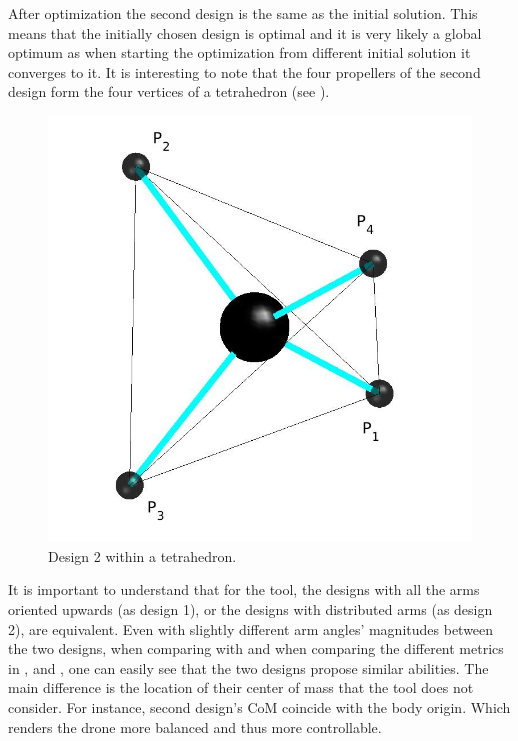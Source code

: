 After optimization the second design is the same as the initial solution. This means
that the initially chosen design is optimal and it is very likely a global optimum
as when starting the optimization from different initial solution it converges to it.
It is interesting to note that the four propellers of the second design form the four
vertices of a tetrahedron (see ).\\

\begin{figure}[!ht]
  \centering
  \includegraphics[width=0.35\linewidth]{images/Quad_tetrahedron.jpg}
  \caption{Design 2 within a tetrahedron.}
  \label{fig:Quadcopter_2_tetra}
\end{figure}

It is important to understand that for the tool, the designs with all the arms
oriented upwards (as design 1), or the designs with distributed arms (as design 2),
are equivalent. Even with slightly different arm angles’ magnitudes
between the two designs, when comparing with
 and when comparing the different metrics
in ,  and
, one can easily see that the two designs
propose similar abilities. The main difference is the location of their center of mass
that the tool does not consider. For instance, second design’s CoM coincide with
the body origin. Which renders the drone more balanced and thus more controllable.\\

